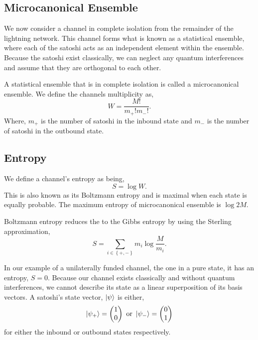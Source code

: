 \documentclass[review,12pt]{elsarticle}
\begin{document}
\subsection{Microcanonical Ensemble}
We now consider a channel in complete isolation from the remainder of the lightning network.
This channel forms what is known as a statistical ensemble, where each of the satoshi acts as an independent element within the ensemble.
Because the satoshi exist classically, we can neglect any quantum interferences and assume that they are orthogonal to each other.

A statistical ensemble that is in complete isolation is called a microcanonical ensemble.
We define the channels multiplicity as,
\begin{equation}
  W = \frac{M!}{m_+!m_-!}. \nonumber
\end{equation}
Where, $m_+$ is the number of satoshi in the inbound state and $m_-$ is the number of satoshi in the outbound state.

\subsection{Entropy}
We define a channel's entropy as being,
\begin{equation}
  S = \log W. \nonumber
\end{equation}
This is also known as its Boltzmann entropy and is maximal when each state is equally probable.
The maximum entropy of microcanonical ensemble is $\log 2 M$.

Boltzmann entropy reduces the to the Gibbs entropy by using the Sterling approximation,
\begin{equation}
  S = \sum_{i\in\left\{+,-\right\}} m_i \log \frac{M}{m_i}. \label{eq:1}
\end{equation}

In our example of a unilaterally funded channel, the one in a pure state, it has an entropy, $S = 0$.
Because our channel exists classically and without quantum interferences, we cannot describe its state as a linear superposition of its basis vectors.
A satoshi's state vector, $\Ket{\psi}$ is either,
\begin{equation}
  \Ket{\psi_+} = \begin{pmatrix}
    1 \\
    0
  \end{pmatrix} \textrm{ or }
  \Ket{\psi_-} = \begin{pmatrix}
    0 \\
    1
  \end{pmatrix} \nonumber
\end{equation}
for either the inbound or outbound states respectively.
\end{document}

